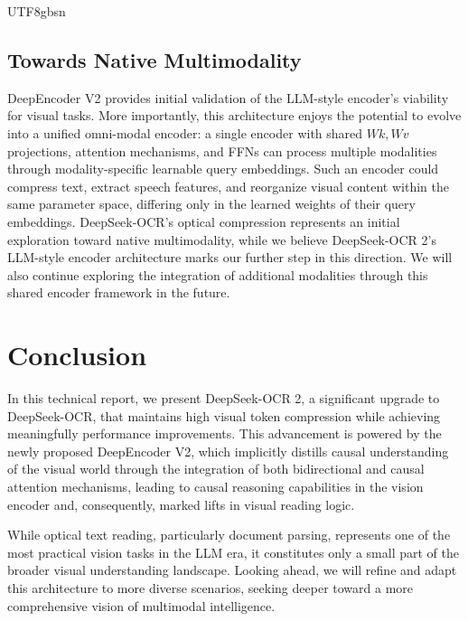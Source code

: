 \documentclass[11pt, a4paper, logo, copyright, nonumbering]{deepseek}
\begin{document}
\begin{CJK*}{UTF8}{gbsn}
\subsection{Towards Native Multimodality}

DeepEncoder V2 provides initial validation of the LLM-style encoder's viability for visual tasks. More importantly, this architecture enjoys the potential to evolve into a unified omni-modal encoder: a single encoder with shared $Wk, Wv$ projections, attention mechanisms, and FFNs can process multiple modalities through modality-specific learnable query embeddings. Such an encoder could compress text, extract speech features, and reorganize visual content within the same parameter space, differing only in the learned weights of their query embeddings. DeepSeek-OCR's optical compression represents an initial exploration toward native multimodality, while we believe DeepSeek-OCR 2's LLM-style encoder architecture marks our further step in this direction. We will also continue exploring the integration of additional modalities through this shared encoder framework in the future.

\section{Conclusion}
In this technical report, we present DeepSeek-OCR 2, a significant upgrade to DeepSeek-OCR, that maintains high visual token compression while achieving meaningfully performance improvements. This advancement is powered by the newly proposed DeepEncoder V2, which implicitly distills causal understanding of the visual world through the integration of both bidirectional and causal attention mechanisms, leading to causal reasoning capabilities in the vision encoder and, consequently, marked lifts in visual reading logic.

While optical text reading, particularly document parsing, represents one of the most practical vision tasks in the LLM era, it constitutes only a small part of the broader visual understanding landscape. Looking ahead, we will refine and adapt this architecture to more diverse scenarios, seeking deeper toward a more comprehensive vision of multimodal intelligence.


\newpage


% 





\end{CJK*}
\end{document}
